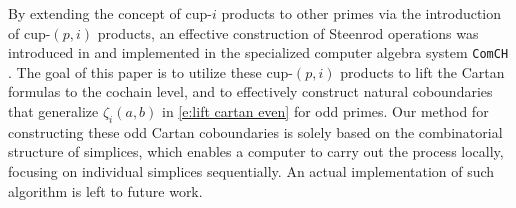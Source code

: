 By extending the concept of cup-$i$ products to other primes via the introduction of cup-$(p,i)$ products, an effective construction of Steenrod operations was introduced in \cite{medina2021may_st} and implemented in the specialized computer algebra system \texttt{ComCH} \cite{medina2021comch}.
The goal of this paper is to utilize these cup-$(p,i)$ products to lift the Cartan formulas to the cochain level, and to effectively construct natural coboundaries that generalize $\zeta_i(a,b)$ in \cref{e:lift cartan even} for odd primes.
Our method for constructing these odd Cartan coboundaries is solely based on the combinatorial structure of simplices, which enables a computer to carry out the process locally, focusing on individual simplices sequentially.
An actual implementation of such algorithm is left to future work.